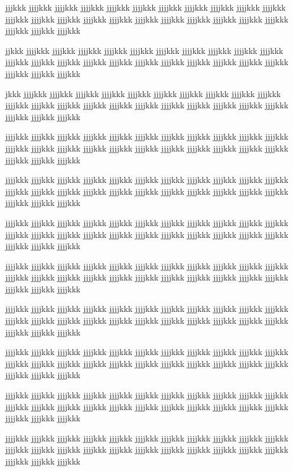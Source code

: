 jjjkkk jjjjkkk jjjjkkk jjjjkkk jjjjkkk jjjjkkk jjjjkkk jjjjkkk jjjjkkk jjjjkkk jjjjkkk jjjjkkk jjjjkkk jjjjkkk jjjjkkk jjjjkkk jjjjkkk jjjjkkk jjjjkkk jjjjkkk jjjjkkk jjjjkkk jjjjkkk jjjjkkk jjjjkkk

jjkkk jjjjkkk jjjjkkk jjjjkkk jjjjkkk jjjjkkk jjjjkkk jjjjkkk jjjjkkk jjjjkkk jjjjkkk jjjjkkk jjjjkkk jjjjkkk jjjjkkk jjjjkkk jjjjkkk jjjjkkk jjjjkkk jjjjkkk jjjjkkk jjjjkkk jjjjkkk jjjjkkk jjjjkkk

jkkk jjjjkkk jjjjkkk jjjjkkk jjjjkkk jjjjkkk jjjjkkk jjjjkkk jjjjkkk jjjjkkk jjjjkkk jjjjkkk jjjjkkk jjjjkkk jjjjkkk jjjjkkk jjjjkkk jjjjkkk jjjjkkk jjjjkkk jjjjkkk jjjjkkk jjjjkkk jjjjkkk jjjjkkk

jjjjkkk jjjjkkk jjjjkkk jjjjkkk jjjjkkk jjjjkkk jjjjkkk jjjjkkk jjjjkkk jjjjkkk jjjjkkk jjjjkkk jjjjkkk jjjjkkk jjjjkkk jjjjkkk jjjjkkk jjjjkkk jjjjkkk jjjjkkk jjjjkkk jjjjkkk jjjjkkk jjjjkkk jjjjkkk

jjjjkkk jjjjkkk jjjjkkk jjjjkkk jjjjkkk jjjjkkk jjjjkkk jjjjkkk jjjjkkk jjjjkkk jjjjkkk jjjjkkk jjjjkkk jjjjkkk jjjjkkk jjjjkkk jjjjkkk jjjjkkk jjjjkkk jjjjkkk jjjjkkk jjjjkkk jjjjkkk jjjjkkk jjjjkkk

jjjjkkk jjjjkkk jjjjkkk jjjjkkk jjjjkkk jjjjkkk jjjjkkk jjjjkkk jjjjkkk jjjjkkk jjjjkkk jjjjkkk jjjjkkk jjjjkkk jjjjkkk jjjjkkk jjjjkkk jjjjkkk jjjjkkk jjjjkkk jjjjkkk jjjjkkk jjjjkkk jjjjkkk jjjjkkk

jjjjkkk jjjjkkk jjjjkkk jjjjkkk jjjjkkk jjjjkkk jjjjkkk jjjjkkk jjjjkkk jjjjkkk jjjjkkk jjjjkkk jjjjkkk jjjjkkk jjjjkkk jjjjkkk jjjjkkk jjjjkkk jjjjkkk jjjjkkk jjjjkkk jjjjkkk jjjjkkk jjjjkkk jjjjkkk

jjjjkkk jjjjkkk jjjjkkk jjjjkkk jjjjkkk jjjjkkk jjjjkkk jjjjkkk jjjjkkk jjjjkkk jjjjkkk jjjjkkk jjjjkkk jjjjkkk jjjjkkk jjjjkkk jjjjkkk jjjjkkk jjjjkkk jjjjkkk jjjjkkk jjjjkkk jjjjkkk jjjjkkk jjjjkkk

jjjjkkk jjjjkkk jjjjkkk jjjjkkk jjjjkkk jjjjkkk jjjjkkk jjjjkkk jjjjkkk jjjjkkk jjjjkkk jjjjkkk jjjjkkk jjjjkkk jjjjkkk jjjjkkk jjjjkkk jjjjkkk jjjjkkk jjjjkkk jjjjkkk jjjjkkk jjjjkkk jjjjkkk jjjjkkk

jjjjkkk jjjjkkk jjjjkkk jjjjkkk jjjjkkk jjjjkkk jjjjkkk jjjjkkk jjjjkkk jjjjkkk jjjjkkk jjjjkkk jjjjkkk jjjjkkk jjjjkkk jjjjkkk jjjjkkk jjjjkkk jjjjkkk jjjjkkk jjjjkkk jjjjkkk jjjjkkk jjjjkkk jjjjkkk

jjjjkkk jjjjkkk jjjjkkk jjjjkkk jjjjkkk jjjjkkk jjjjkkk jjjjkkk jjjjkkk jjjjkkk jjjjkkk jjjjkkk jjjjkkk jjjjkkk jjjjkkk jjjjkkk jjjjkkk jjjjkkk jjjjkkk jjjjkkk jjjjkkk jjjjkkk jjjjkkk jjjjkkk jjjjkkk

